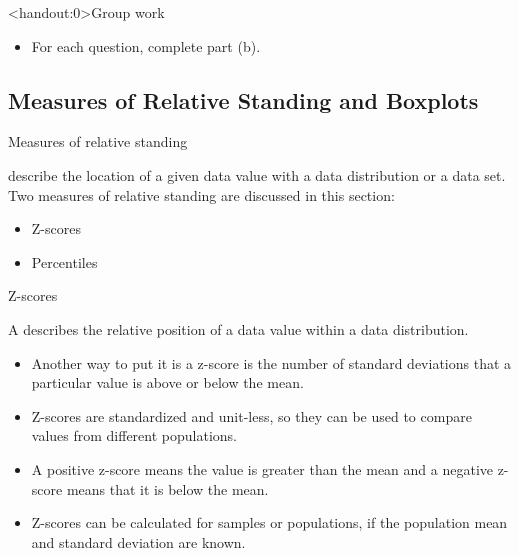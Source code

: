 \documentclass[xcolor=table]{beamer}
\begin{document}
\begin{frame}<handout:0>{Group work}
\begin{block}{}
\large
\begin{itemize}
\item For each question, complete part (b).
\end{itemize}
\end{block}
\end{frame}

\subsection{Measures of Relative Standing and Boxplots}

\begin{frame}{Measures of relative standing}
\begin{block}{}
\large
{} describe the location of a given data value with a data distribution or a data set.\\
\medskip
Two measures of relative standing are discussed in this section:
\begin{itemize}
\item Z-scores
\item Percentiles
\end{itemize}
\end{block}
\end{frame}

\begin{frame}{Z-scores}
\begin{block}{}
\large
A  describes the relative position of a data value within a data distribution.
\begin{itemize}
\pause
\item Another way to put it is a z-score is the number of standard deviations that a particular value is above or below the mean.
\pause
\item Z-scores are standardized and unit-less, so they can be used to compare values from different populations.
\pause
\item A positive z-score means the value is greater than the mean and a negative z-score means that it is below the mean. 
\pause
\item Z-scores can be calculated for samples or populations, if the population mean and standard deviation are known.
\end{itemize}
\end{block}
\end{frame}
\end{document}
